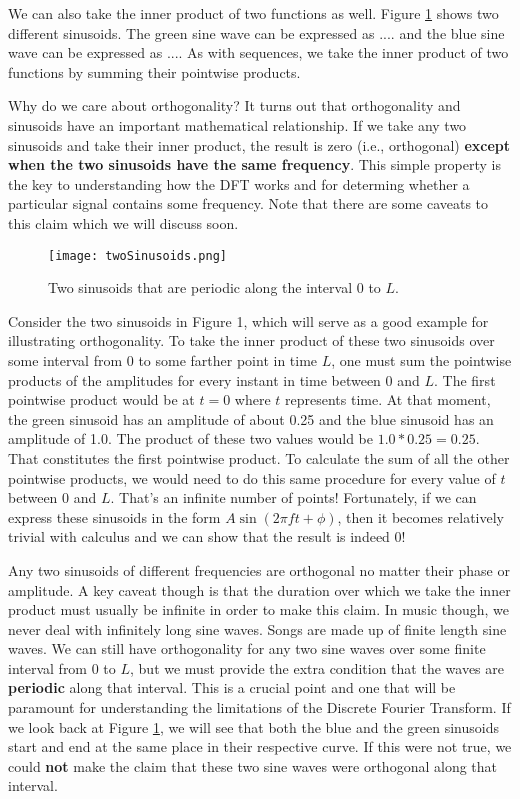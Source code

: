 We can also take the inner product of two functions as well.  Figure \ref{fig:twoSines} shows two different 
sinusoids.  The green sine wave can be expressed as .... and the blue sine wave can be expressed as ....  As with
sequences, we take the inner product of two functions by summing their pointwise products.  

Why do we care about orthogonality?  It turns out that orthogonality and sinusoids have an important 
mathematical relationship.  If we take any two sinusoids and take their inner product, the result is zero
(i.e., orthogonal) 
\textbf{except when the two sinusoids have the same frequency}.  This simple property is the key to 
understanding how the DFT works and for determing whether a particular signal contains some frequency.  
Note that there are some caveats to this claim which we will discuss soon.

\begin{figure}[h]
	\caption{Two sinusoids that are periodic along the interval 0 to $L$.}
	\centering
	\texttt{[image: twoSinusoids.png]}
	\label{fig:twoSines}
\end{figure}

Consider the two sinusoids in Figure 1, which will serve as a good example for illustrating orthogonality.  To 
take the inner product of these two sinusoids over some interval from 0 to some farther point in time $L$, 
one must sum the pointwise products of the amplitudes
for every instant in time between 0 and $L$.  The first pointwise product would be at $t = 0$ where $t$ 
represents time.  At that moment, the green sinusoid has an amplitude of about 0.25 and the blue sinusoid has
an amplitude of 1.0.  The product of these two values would be $1.0 * 0.25 = 0.25$.  That constitutes the first pointwise product.
To calculate the sum of all the other pointwise products, we would need to do this same procedure for every value of $t$
between 0 and $L$.  That's an infinite number of points!  Fortunately, 
if we can express these sinusoids in the form $A\sin(2\pi ft + \phi)$, then
it becomes relatively trivial with calculus and we can show that the result is indeed 0! 

Any two sinusoids of different frequencies are orthogonal no matter their phase or amplitude.  A key caveat though
is that the duration over which we take the inner product must usually be infinite in order to make this claim.  In 
music though, we never deal with infinitely long sine waves.  Songs are made up of finite length sine waves.  We
can still have orthogonality for any two sine waves over some finite interval from 0 to $L$, but we must provide
the extra condition that the waves are \textbf{periodic} along that interval.  This is a crucial point and one that 
will be paramount for 
understanding the limitations of the Discrete Fourier Transform.  If we look back at Figure \ref{fig:twoSines}, 
we will see that 
both the blue and the green sinusoids start and end at the same place in their respective curve.  If this were not true,
we could \textbf{not} make the claim that these two sine waves were orthogonal along that interval.  

